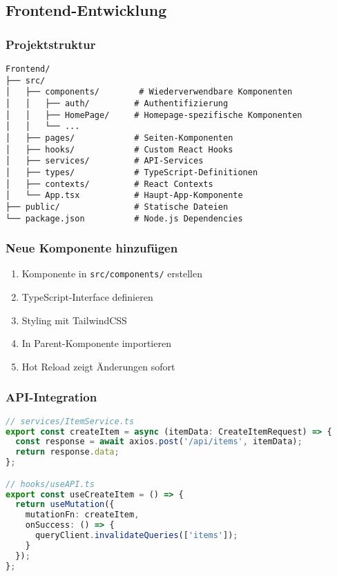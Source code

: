 \documentclass[a4paper,12pt]{article}
\begin{document}
\subsection{Frontend-Entwicklung}

\subsubsection{Projektstruktur}
\begin{lstlisting}
Frontend/
├── src/
│   ├── components/        # Wiederverwendbare Komponenten
│   │   ├── auth/         # Authentifizierung
│   │   ├── HomePage/     # Homepage-spezifische Komponenten
│   │   └── ...
│   ├── pages/            # Seiten-Komponenten
│   ├── hooks/            # Custom React Hooks
│   ├── services/         # API-Services
│   ├── types/            # TypeScript-Definitionen
│   ├── contexts/         # React Contexts
│   └── App.tsx           # Haupt-App-Komponente
├── public/               # Statische Dateien
└── package.json          # Node.js Dependencies
\end{lstlisting}

\subsubsection{Neue Komponente hinzufügen}
\begin{enumerate}
    \item Komponente in \texttt{src/components/} erstellen
    \item TypeScript-Interface definieren
    \item Styling mit TailwindCSS
    \item In Parent-Komponente importieren
    \item Hot Reload zeigt Änderungen sofort
\end{enumerate}

\subsubsection{API-Integration}
\begin{lstlisting}[language=typescript]
// services/ItemService.ts
export const createItem = async (itemData: CreateItemRequest) => {
  const response = await axios.post('/api/items', itemData);
  return response.data;
};

// hooks/useAPI.ts
export const useCreateItem = () => {
  return useMutation({
    mutationFn: createItem,
    onSuccess: () => {
      queryClient.invalidateQueries(['items']);
    }
  });
};
\end{lstlisting}
\end{document}
